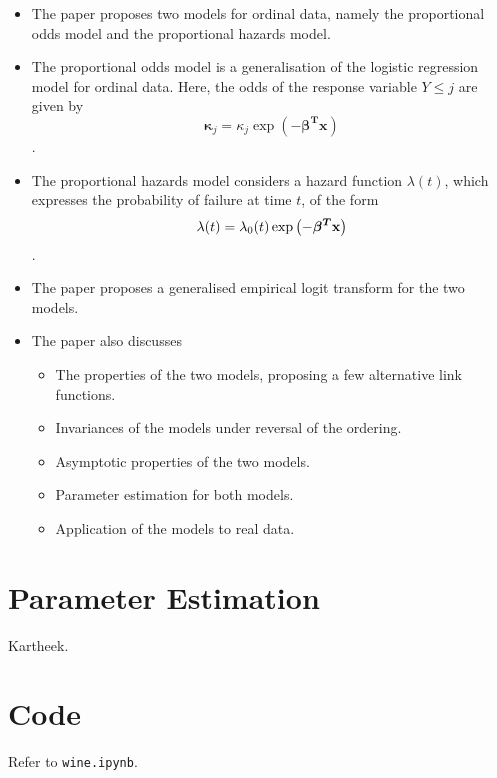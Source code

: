 \documentclass[reqno]{amsart}
\begin{document}
    \begin{itemize}
        \item The paper proposes two models for ordinal data, namely the proportional odds model and the proportional hazards model.
        \item The proportional odds model is a generalisation of the logistic regression model for ordinal data. Here, the odds of the response variable \(Y \leq j\) are given by \[\mathbf{\kappa}_j = \kappa_j \exp (- \boldsymbol{\beta^T} \mathbf{x})\].
        \item The proportional hazards model considers a hazard function \(\lambda(t)\), which expresses the probability of failure at time \(t\), of the form \[\lambda(t) = \lambda_0(t) \exp \left(- \boldsymbol{\beta^T} \mathbf{x}\right)\].
        \item The paper proposes a generalised empirical logit transform for the two models.
        \item The paper also discusses \begin{itemize}
            \item The properties of the two models, proposing a few alternative link functions.
            \item Invariances of the models under reversal of the ordering.
            \item Asymptotic properties of the two models.
            \item Parameter estimation for both models.
            \item Application of the models to real data.
        \end{itemize} 
    \end{itemize}

    \section{Parameter Estimation}

    Kartheek.

    \section{Code}

    Refer to \texttt{wine.ipynb}.
\end{document}
